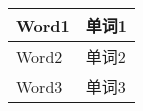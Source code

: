 \documentclass[10pt]{article} %
\begin{document}
\begin{multicols}{2} %

\begin{tabular}{@{}p{}@{} p{}@{}}
\toprule %
Word1 & 单词1 \\ \midrule
Word2 & 单词2 \\ \midrule
Word3 & 单词3 \\ \midrule
\bottomrule %
\end{tabular}


\end{multicols}
\end{document}
